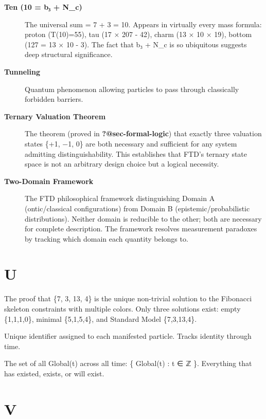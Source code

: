 \documentclass[
  11pt,
  letterpaper,
  twoside,
  openany]{book}
\makeatletter
\providecommand{\tightlist}{%
  \setlength{\itemsep}{0pt}\setlength{\parskip}{0pt}}
\let\orig@section\section
\renewcommand{\section}{\needspace{8\baselineskip}\orig@section}
\makeatother
\begin{document}
\begin{description}
\item[\textbf{Ten (10 = b₃ + N\_c)}]
The universal sum = 7 + 3 = 10. Appears in virtually every mass formula:
proton (T(10)=55), tau (17 × 207 - 42), charm (13 × 10 × 19), bottom
(127 = 13 × 10 - 3). The fact that b₃ + N\_c is so ubiquitous suggests
deep structural significance.
\item[\textbf{Tunneling}]
Quantum phenomenon allowing particles to pass through classically
forbidden barriers.
\item[\textbf{Ternary Valuation Theorem}]
The theorem (proved in \textbf{?@sec-formal-logic}) that exactly three
valuation states \{+1, −1, 0\} are both necessary and sufficient for any
system admitting distinguishability. This establishes that FTD's ternary
state space is not an arbitrary design choice but a logical necessity.
\item[\textbf{Two-Domain Framework}]
The FTD philosophical framework distinguishing Domain A (ontic/classical
configurations) from Domain B (epistemic/probabilistic distributions).
Neither domain is reducible to the other; both are necessary for
complete description. The framework resolves measurement paradoxes by
tracking which domain each quantity belongs to.
\end{description}

\section{U}\label{u}

\begin{description}
\tightlist
\item[\textbf{Uniqueness Theorem}]
The proof that \{7, 3, 13, 4\} is the unique non-trivial solution to the
Fibonacci skeleton constraints with multiple colors. Only three
solutions exist: empty \{1,1,1,0\}, minimal \{5,1,5,4\}, and Standard
Model \{7,3,13,4\}.
\item[\textbf{UUID}]
Unique identifier assigned to each manifested particle. Tracks identity
through time.
\item[\textbf{𝕌 (Universe)}]
The set of all Global(t) across all time: \{ Global(t) : t ∈ ℤ \}.
Everything that has existed, exists, or will exist.
\end{description}

\section{V}\label{v}
\end{document}

